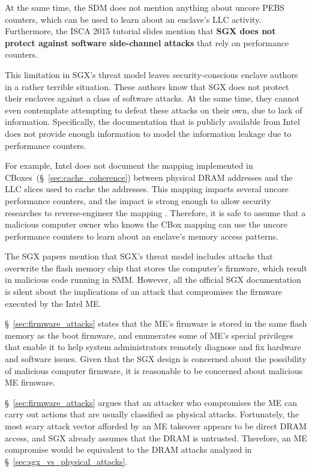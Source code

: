 
At the same time, the SDM does not mention anything about uncore PEBS counters,
which can be used to learn about an enclave's LLC activity. Furthermore, the
ISCA 2015 tutorial slides mention that \textbf{SGX does not protect against
software side-channel attacks} that rely on performance counters.

This limitation in SGX's threat model leaves security-conscious enclave authors
in a rather terrible situation. These authors know that SGX does not protect
their enclaves against a class of software attacks. At the same time, they
cannot even contemplate attempting to defeat these attacks on their own, due to
lack of information. Specifically, the documentation that is publicly available
from Intel does not provide enough information to model the information leakage
due to performance counters.

For example, Intel does not document the mapping implemented in
CBoxes~(\S~\ref{sec:cache_coherence}) between physical DRAM addresses and the
LLC slices used to cache the addresses. This mapping impacts several uncore
performance counters, and the impact is strong enough to allow security
researches to reverse-engineer the mapping \cite{inci2015rsachannel,
maurice2015intelhash, yarom2015intelhash}. Therefore, it is safe to assume that
a malicious computer owner who knows the CBox mapping can use the uncore
performance counters to learn about an enclave's memory access patterns.

The SGX papers mention that SGX's threat model includes attacks that overwrite
the flash memory chip that stores the computer's firmware, which result in
malicious code running in SMM.  However, all the official SGX documentation is
silent about the implications of an attack that compromises the firmware
executed by the Intel ME.

\S~\ref{sec:firmware_attacks} states that the ME's firmware is stored in the
same flash memory as the boot firmware, and enumerates some of ME's special
privileges that enable it to help system administrators remotely diagnose and
fix hardware and software issues. Given that the SGX design is concerned about
the possibility of malicious computer firmware, it is reasonable to be
concerned about malicious ME firmware.

\S~\ref{sec:firmware_attacks} argues that an attacker who compromises the ME
can carry out actions that are usually classified as physical attacks.
Fortunately, the most scary attack vector afforded by an ME takeover appears to
be direct DRAM access, and SGX already assumes that the DRAM is untrusted.
Therefore, an ME compromise would be equivalent to the DRAM attacks analyzed in
\S~\ref{sec:sgx_vs_physical_attacks}.


